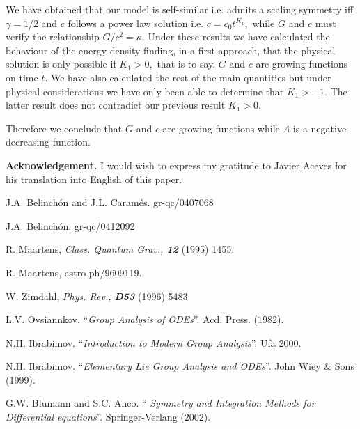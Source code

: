 \documentclass{revtex4}
\begin{document}
We have obtained that our model is self-similar i.e. admits a scaling
symmetry iff $\gamma =1/2$ and $c$ follows a power law solution i.e. $%
c=c_{0}t^{K_{1}},$ while $G$ and $c$ must verify the relationship $%
G/c^{2}=\kappa .$ Under these results we have calculated the behaviour of the
energy density finding, in a first approach, that the physical solution is
only possible if $K_{1}>0,$ that is to say, $G$ and $c$ are growing
functions on time $t.$ We have also calculated the rest of the main
quantities but under physical considerations we have only been able to
determine that $K_{1}>-1.$ The latter result does not contradict our previous
result $K_{1}>0.$

Therefore we conclude that $G$ and $c$ are growing functions while
$\Lambda $ is a negative decreasing function. \vspace{1cm}

 \textbf{Acknowledgement.} I would wish to express my gratitude to
Javier Aceves for his translation into English of this paper.


\begin{thebibliography}{9}
  {\small J.A. Belinch\'{o}n and J.L. Caram\'{e}s.
gr-qc/0407068}

  {\small J.A. Belinch\'{o}n. gr-qc/0412092}

  {\small R. Maartens, \textit{Class. Quantum
Grav., \textbf{12}} (1995) 1455. }

{\small R. Maartens, astro-ph/9609119. }

  {\small W. Zimdahl, \textit{Phys. Rev., \textbf{D53}} (1996)
5483.}

  {\small L.V. Ovsiannkov. ``\textit{Group Analysis of
ODEs}''. Acd. Press. (1982). }

  {\small N.H. Ibrabimov. ``\textit{Introduction
to Modern Group Analysis}''. Ufa 2000. }

{\small N.H. Ibrabimov. ``\textit{Elementary Lie Group Analysis
and ODEs}''. John Wiey \& Sons (1999). }

  {\small G.W. Blumann and S.C. Anco. ``\textit{%
Symmetry and Integration Methods for Differential equations}''.
Springer-Verlang (2002). }


\end{thebibliography}
\end{document}
